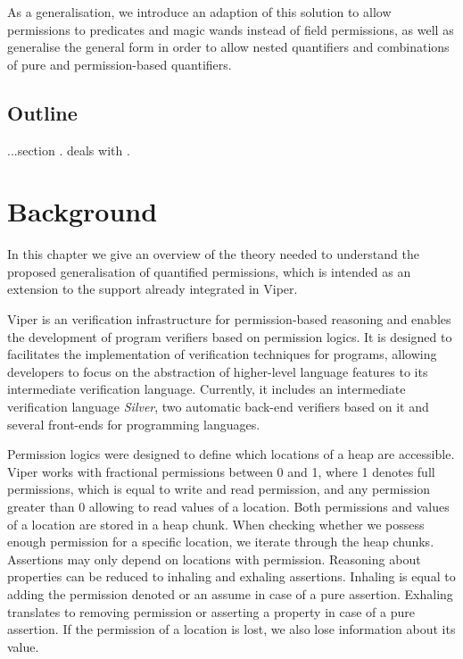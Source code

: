 \documentclass[12pt]{article}
\begin{document}
As a generalisation, we introduce an adaption of this solution to allow permissions to predicates\cite{predicates} and magic wands\cite{magicwand} instead of field permissions, as well as generalise the general form in order to allow nested quantifiers and combinations of pure and permission-based quantifiers.

\subsection{Outline}

...section . deals with .

\section{Background}
In this chapter we give an overview of the theory needed to understand the proposed generalisation of quantified permissions, which is intended as an extension to the support already integrated in Viper\cite{viper}.

Viper is an verification infrastructure for permission-based reasoning and enables the development of program verifiers based on permission logics. It is designed to facilitates the implementation of verification techniques for programs, allowing developers to focus on the abstraction of higher-level language features to its intermediate verification language. Currently, it includes an intermediate verification language \textit{Silver}, two automatic back-end verifiers based on it and several front-ends for programming languages.

Permission logics were designed to define which locations of a heap are accessible. Viper works with fractional permissions between 0 and 1, where 1 denotes full permissions, which is equal to write and read permission, and any permission greater than 0 allowing to read values of a location. Both permissions and values of a location are stored in a heap chunk. When checking whether we possess enough permission for a specific location, we iterate through the heap chunks.
Assertions may only depend on locations with permission. Reasoning about properties can be reduced to inhaling and exhaling assertions. Inhaling is equal to adding the permission denoted or an assume in case of a pure assertion. Exhaling translates to removing permission or asserting a property in case of a pure assertion. If the permission of a location is lost, we also lose information about its value.
\end{document}
